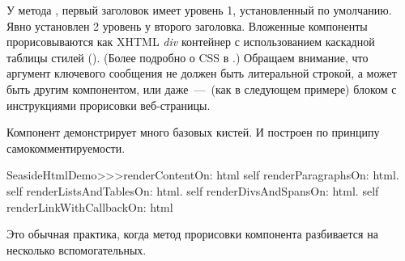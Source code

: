 \documentclass[a4paper,10pt,twoside]{book}
\begin{document}




У метода , первый заголовок имеет уровень 1,
установленный по умолчанию.
Явно установлен 2 уровень у второго заголовка.
Вложенные компоненты прорисовываются как XHTML \emph{div} контейнер
с использованием каскадной таблицы стилей ().
(Более подробно о CSS в .)
Обращаем внимание, что аргумент ключевого сообщения 
не должен быть литеральной строкой, а может быть другим компонентом,
или даже \,---\, (как в следующем примере) блоком с инструкциями
прорисовки веб-страницы.


Компонент  демонстрирует много базовых кистей.
И построен по принципу самокомментируемости.

\begin{code}{}
SeasideHtmlDemo>>>renderContentOn: html 
	self renderParagraphsOn: html.
	self renderListsAndTablesOn: html.
	self renderDivsAndSpansOn: html.
	self renderLinkWithCallbackOn: html
\end{code}


Это обычная практика,
когда метод прорисовки компонента разбивается на несколько вспомогательных.

\end{document}
